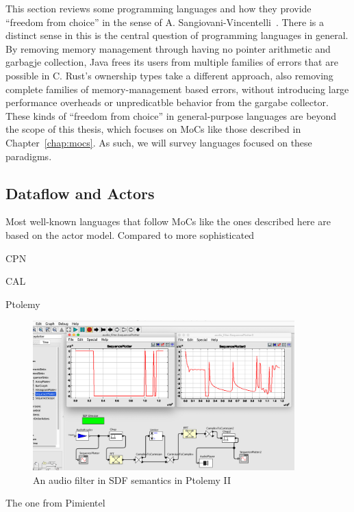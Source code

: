 This section reviews some programming languages and how they provide ``freedom from choice'' in the sense of A. Sangiovani-Vincentelli~\cite{lee2019freedom}.
There is a distinct sense in this is the central question of programming languages in general.
By removing memory management through having no pointer arithmetic and garbagje collection, Java frees its users from multiple families of errors that are possible in C.
Rust's ownership types take a different approach, also removing complete families of memory-management based errors, without introducing large performance overheads or unpredicatble behavior from the gargabe collector.
These kinds of ``freedom from choice'' in general-purpose languages are beyond the scope of this thesis, which focuses on \acp{MoC} like those described in Chapter~\ref{chap:mocs}.
As such, we will survey languages focused on these paradigms.

\subsection{Dataflow and Actors}
\label{sec:general_dataflow_tools}


Most well-known languages that follow \acp{MoC} like the ones described here are based on the actor model.
Compared to more sophisticated

CPN

CAL

Ptolemy
\begin{figure}[t]
	\centering
	\includegraphics[width=0.9\textwidth]{figures/audio_filter_ptolemy_screenshot.png}
	\caption{An audio filter in \ac{SDF} semantics in Ptolemy II}
	\label{fig:audio_filter_ptolemy}
\end{figure}

The one from Pimientel

